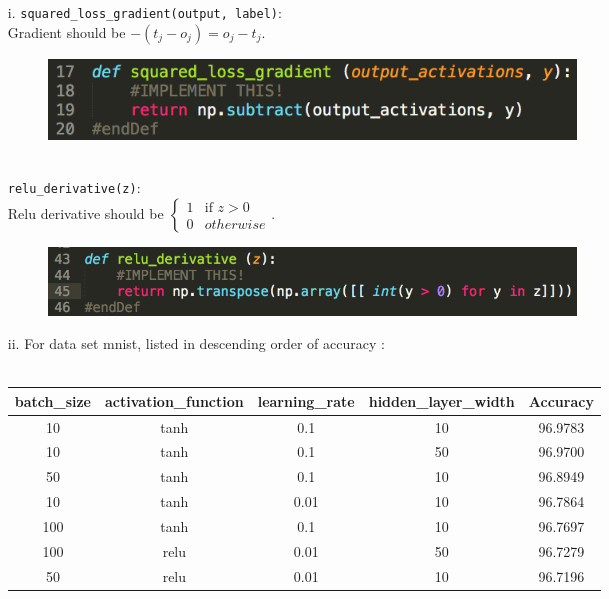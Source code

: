 \item[(b)]
	\begin{itemize}  
	\item[i.]	
	{\tt squared\_loss\_gradient(output, label)}:\\
	Gradient should be $-(t_j-o_j)= o_j-t_j$.
	\begin{figure}[h]
  		\centering
    	\includegraphics[width=0.7\textwidth]{fig1.png}
	\end{figure}\\
	{\tt relu\_derivative(z)}:\\
	Relu derivative should be 
	$\begin{cases}
		1 & \mbox{if } z > 0 \\
		0 & otherwise
	\end{cases}$.
	\begin{figure}[h]
  		\centering
    	\includegraphics[width=0.7\textwidth]{fig2.png}
	\end{figure}
	\item[ii.]
	 For data set mnist, listed in descending order of accuracy : \\\\
	\begin{tabular}{ | c | c | c | c | c |  }
	\hline
		batch\_size & activation\_function & learning\_rate & hidden\_layer\_width & Accuracy   \\ \hline
		10 & tanh & 0.1 & 10 & 96.9783  \\ \hline
		10 & tanh & 0.1 & 50 & 96.9700  \\ \hline
		50 & tanh & 0.1 & 10 & 96.8949  \\ \hline
		10 & tanh & 0.01 & 10 & 96.7864  \\ \hline
		100 & tanh & 0.1 & 10 & 96.7697  \\ \hline
		100 & relu & 0.01 & 50 & 96.7279  \\ \hline
		50 & relu & 0.01 & 10 & 96.7196  \\ \hline

\end{tabular}
\end{itemize}
